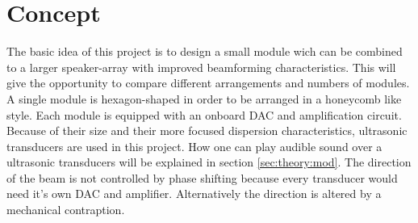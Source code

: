 \chapter{Concept}\label{sec:concept}


The basic idea of this project is to design a small module wich can be combined to a larger speaker-array with improved beamforming characteristics. This will give the opportunity to compare different arrangements and numbers of modules. A single module is hexagon-shaped in order to be arranged in a honeycomb like style. Each module is equipped with an onboard DAC and amplification circuit.\p
Because of their size and their more focused dispersion characteristics, ultrasonic transducers are used in this project. How one can play audible sound over a ultrasonic transducers will be explained in section \ref{sec:theory:mod}.\p
The direction of the beam is not controlled by phase shifting because every transducer would need it's own DAC and amplifier. Alternatively the direction is altered by a mechanical contraption.
